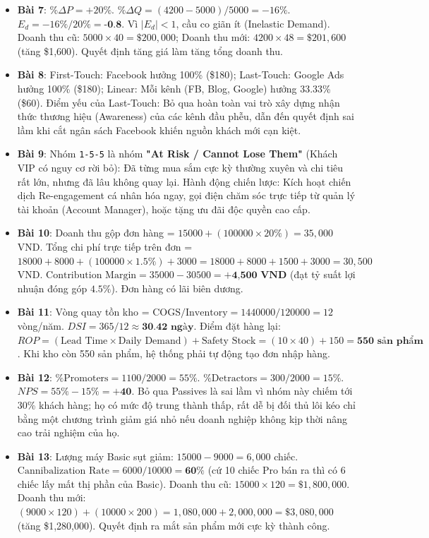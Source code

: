 \begin{dapanbox}
\begin{itemize}
    \item \textbf{Bài 7}: $\% \Delta P = +20\%$. $\% \Delta Q = (4200 - 5000)/5000 = -16\%$. $E_d = -16\% / 20\% = \textbf{-0.8}$. Vì $|E_d| < 1$, cầu co giãn ít (Inelastic Demand). Doanh thu cũ: $5000 \times 40 = \$200,000$; Doanh thu mới: $4200 \times 48 = \$201,600$ (tăng \$1,600). Quyết định tăng giá làm tăng tổng doanh thu.
    \item \textbf{Bài 8}: First-Touch: Facebook hưởng 100\% (\$180); Last-Touch: Google Ads hưởng 100\% (\$180); Linear: Mỗi kênh (FB, Blog, Google) hưởng 33.33\% (\$60). Điểm yếu của Last-Touch: Bỏ qua hoàn toàn vai trò xây dựng nhận thức thương hiệu (Awareness) của các kênh đầu phễu, dẫn đến quyết định sai lầm khi cắt ngân sách Facebook khiến nguồn khách mới cạn kiệt.
    \item \textbf{Bài 9}: Nhóm \texttt{1-5-5} là nhóm \textbf{"At Risk / Cannot Lose Them"} (Khách VIP có nguy cơ rời bỏ): Đã từng mua sắm cực kỳ thường xuyên và chi tiêu rất lớn, nhưng đã lâu không quay lại. Hành động chiến lược: Kích hoạt chiến dịch Re-engagement cá nhân hóa ngay, gọi điện chăm sóc trực tiếp từ quản lý tài khoản (Account Manager), hoặc tặng ưu đãi độc quyền cao cấp.
    \item \textbf{Bài 10}: Doanh thu gộp đơn hàng = $15000 + (100000 \times 20\%) = 35,000$ VND. Tổng chi phí trực tiếp trên đơn = $18000 + 8000 + (100000 \times 1.5\%) + 3000 = 18000 + 8000 + 1500 + 3000 = 30,500$ VND. $\text{Contribution Margin} = 35000 - 30500 = \textbf{+4,500 VND}$ (đạt tỷ suất lợi nhuận đóng góp $4.5\%$). Đơn hàng có lãi biên dương.
    \item \textbf{Bài 11}: Vòng quay tồn kho = $\text{COGS} / \text{Inventory} = 1440000 / 120000 = 12$ vòng/năm. $DSI = 365 / 12 \approx \textbf{30.42 ngày}$. Điểm đặt hàng lại: $ROP = (\text{Lead Time} \times \text{Daily Demand}) + \text{Safety Stock} = (10 \times 40) + 150 = \textbf{550 sản phẩm}$. Khi kho còn 550 sản phẩm, hệ thống phải tự động tạo đơn nhập hàng.
    \item \textbf{Bài 12}: $\% \text{Promoters} = 1100 / 2000 = 55\%$. $\% \text{Detractors} = 300 / 2000 = 15\%$. $NPS = 55\% - 15\% = \textbf{+40}$. Bỏ qua Passives là sai lầm vì nhóm này chiếm tới 30\% khách hàng; họ có mức độ trung thành thấp, rất dễ bị đối thủ lôi kéo chỉ bằng một chương trình giảm giá nhỏ nếu doanh nghiệp không kịp thời nâng cao trải nghiệm của họ.
    \item \textbf{Bài 13}: Lượng máy Basic sụt giảm: $15000 - 9000 = 6,000$ chiếc. $\text{Cannibalization Rate} = 6000 / 10000 = \textbf{60\%}$ (cứ 10 chiếc Pro bán ra thì có 6 chiếc lấy mất thị phần của Basic). Doanh thu cũ: $15000 \times 120 = \$1,800,000$. Doanh thu mới: $(9000 \times 120) + (10000 \times 200) = 1,080,000 + 2,000,000 = \$3,080,000$ (tăng \$1,280,000). Quyết định ra mắt sản phẩm mới cực kỳ thành công.

\end{itemize}
\end{dapanbox}
